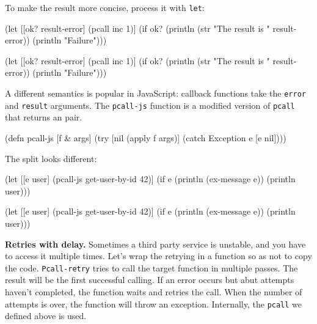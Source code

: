 To make the result more concise, process it with \verb|let|:

\ifx\DEVICETYPE\MOBILE

\begin{clojure}
(let [[ok? result-error] (pcall inc 1)]
  (if ok?
    (println
      (str "The result is "
        result-error))
    (println "Failure")))
\end{clojure}

\else

\begin{clojure}
(let [[ok? result-error] (pcall inc 1)]
  (if ok?
    (println (str "The result is " result-error))
    (println "Failure")))
\end{clojure}

\fi


A different semantics is popular in JavaScript: callback functions take the \verb|error| and \verb|result| arguments. The \verb|pcall-js| function is a modified version of \verb|pcall| that returns an  pair.

\begin{clojure}
(defn pcall-js [f & args]
  (try
    [nil (apply f args)]
    (catch Exception e [e nil])))
\end{clojure}

\noindent
The split looks different:

\ifx\DEVICETYPE\MOBILE

\begin{clojure}
(let [[e user]
      (pcall-js get-user-by-id 42)]
  (if e
    (println (ex-message e))
    (println user)))
\end{clojure}

\else

\begin{clojure}
(let [[e user] (pcall-js get-user-by-id 42)]
  (if e
    (println (ex-message e))
    (println user)))
\end{clojure}

\fi


\textbf{ Retries with delay.} Sometimes a third party service is unstable, and you have to access it multiple times. Let's wrap the retrying in a function so as not to copy the code. \verb|Pcall-retry| tries to call the target function in multiple passes. The result will be the first successful calling. If an error occurs but abut attempts haven't completed, the function waits and retries the call. When the number of attempts is over, the function will throw an exception.
Internally, the \verb|pcall| we defined above is used.

